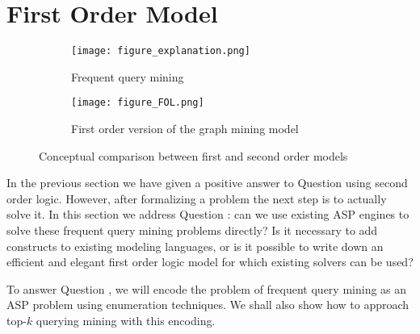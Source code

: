 \section{First Order Model}\label{sec:fol}
\begin{figure}[tbh]
\begin{subfigure}{.49\textwidth}
    \begin{center}
      \texttt{[image: figure\_explanation.png]}
      \caption{Frequent query mining}
      \label{fig:mining_def}
    \end{center}
  \end{subfigure}
  \hfill 
  \begin{subfigure}{.50\textwidth}
    \begin{center}
    \texttt{[image: figure\_FOL.png]}
    \caption{First order version of the graph mining model}
    \label{fig:fol}
    \end{center}
  \end{subfigure}
  \caption{Conceptual comparison between first and second order models}
\end{figure}
In the previous section we have given a positive answer to Question \qone using second order logic. However, after formalizing a problem the next step is to actually solve it. In this section we address Question \qtwo: can we use existing ASP engines to solve these frequent query mining problems directly? Is it necessary to add constructs to existing modeling languages, or is it possible to write down an efficient and elegant first order logic model for which existing solvers can be used?

To answer Question \qtwo, we will encode the problem of frequent query mining as an ASP problem using enumeration techniques. We shall also show how to approach top-$k$ querying mining with this encoding.
\vspace{-10pt}
